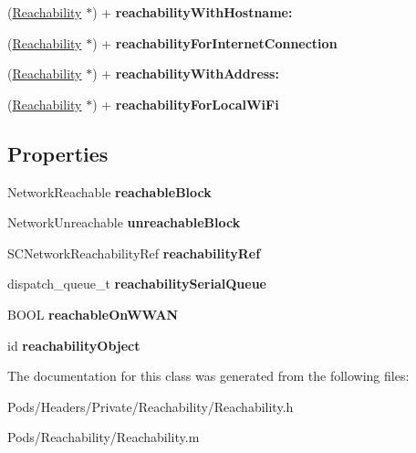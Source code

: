 \begin{DoxyCompactItemize}
\item 
\mbox{\label{interface_reachability_a28cf8da75a1ea6e2b7bb37a1059bd4bd}} 
(\mbox{\hyperlink{interface_reachability}{Reachability}} $\ast$) + {\bfseries reachability\+With\+Hostname\+:}
\item 
\mbox{\label{interface_reachability_a0ee51a19a66b82725775d6cb4e88b0c2}} 
(\mbox{\hyperlink{interface_reachability}{Reachability}} $\ast$) + {\bfseries reachability\+For\+Internet\+Connection}
\item 
\mbox{\label{interface_reachability_a6707d0d4497e00cfaade2127f1c2504b}} 
(\mbox{\hyperlink{interface_reachability}{Reachability}} $\ast$) + {\bfseries reachability\+With\+Address\+:}
\item 
\mbox{\label{interface_reachability_a91b75dbb4e925d230210d6854fefbe25}} 
(\mbox{\hyperlink{interface_reachability}{Reachability}} $\ast$) + {\bfseries reachability\+For\+Local\+Wi\+Fi}
\end{DoxyCompactItemize}
\subsection*{Properties}
\begin{DoxyCompactItemize}
\item 
\mbox{\label{interface_reachability_ac0ef2a5c4b1470394ab5c1942100fd82}} 
Network\+Reachable {\bfseries reachable\+Block}
\item 
\mbox{\label{interface_reachability_a094a49485d02681b0df97bc413714c79}} 
Network\+Unreachable {\bfseries unreachable\+Block}
\item 
\mbox{\label{interface_reachability_a7ccf303c2e5a2462854d2dcb452229a8}} 
S\+C\+Network\+Reachability\+Ref {\bfseries reachability\+Ref}
\item 
\mbox{\label{interface_reachability_afb7a610fb1c16d37905deeda0de512c8}} 
dispatch\+\_\+queue\+\_\+t {\bfseries reachability\+Serial\+Queue}
\item 
\mbox{\label{interface_reachability_aa6c9eada73d41380aa056539fd005b21}} 
B\+O\+OL {\bfseries reachable\+On\+W\+W\+AN}
\item 
\mbox{\label{interface_reachability_a3c4a914576f7ee5e0a9b13d0148ddea3}} 
id {\bfseries reachability\+Object}
\end{DoxyCompactItemize}


The documentation for this class was generated from the following files\+:\begin{DoxyCompactItemize}
\item 
Pods/\+Headers/\+Private/\+Reachability/Reachability.\+h\item 
Pods/\+Reachability/Reachability.\+m\end{DoxyCompactItemize}
